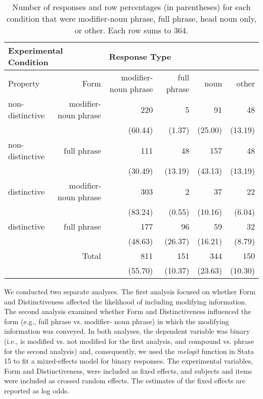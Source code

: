 \documentclass[output=paper]{langsci/langscibook}
\begin{document}
\begin{table}
  \caption{Number of responses and row percentages (in parentheses)
    for each condition that were modifier-noun phrase, full phrase,
    head noun only, or other. Each row sums to 364.}
  \label{tab:no-responses}

  \footnotesize
  \begin{tabular}{lrrrrr} \hline

    \multicolumn{2}{l}{Experimental Condition} & \multicolumn{4}{l}{Response Type} \\ \hline

    Property & Form & modifier-noun phrase & full phrase & noun & other \\ \hline

    non-distinctive & modifier-noun phrase & 220 & 5  & 91 & 48  \\

                    & & (60.44) & (1.37) & (25.00) & (13.19) \\

    non-distinctive & full phrase & 111 & 48  & 157  & 48  \\

                    & & (30.49) & (13.19) & (43.13) & (13.19) \\

    distinctive & modifier-noun phrase & 303 & 2  & 37  & 22  \\

                    & & (83.24) & (0.55) & (10.16) & (6.04) \\

    distinctive & full phrase & 177 & 96 & 59  & 32  \\

                    & & (48.63) & (26.37) & (16.21) & (8.79) \\ \hline

                    & Total & 811 & 151  & 344  & 150  \\
                              
                & & (55.70) & (10.37) & (23.63)  & (10.30) \\ \hline
                    
  \end{tabular}
\end{table}

We conducted two separate analyses. The first analysis focused on
whether Form and Distinctiveness affected the likelihood of including
modifying information. The second analysis examined whether Form and
Distinctiveness influenced the form (e.g., full phrase vs. modifier-
noun phrase) in which the modifying information was conveyed. In both
analyses, the dependent variable was binary (i.e., is modified vs. not
modified for the first analysis, and compound vs.  phrase for the
second analysis) and, consequently, we used the \textit{melogit}
function in Stata 15 to fit a mixed-effects model for binary
responses. The experimental variables, Form and Distinctiveness, were
included as fixed effects, and subjects and items were included as
crossed random effects. The estimates of the fixed effects are
reported as log odds.
\end{document}
